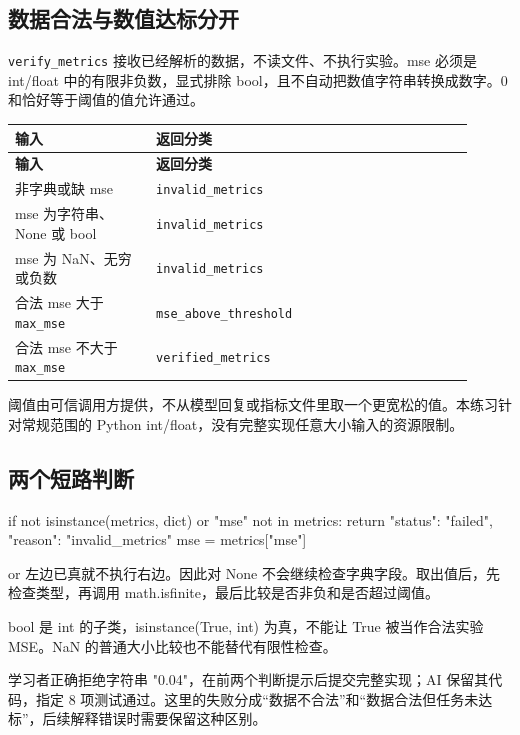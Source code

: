 \documentclass[UTF8,zihao=-4,fontset=fandol]{ctexart}
\begin{document}
\subsection{数据合法与数值达标分开}

\nolinkurl{verify_metrics} 接收已经解析的数据，不读文件、不执行实验。mse 必须是 int/float 中的有限非负数，显式排除 bool，且不自动把数值字符串转换成数字。0 和恰好等于阈值的值允许通过。

{\small\setlength{\tabcolsep}{4pt}
\renewcommand{\arraystretch}{1.25}
\begin{longtable}{>{\raggedright\arraybackslash}p{0.28\linewidth}>{\raggedright\arraybackslash}p{0.63\linewidth}}
\toprule
\textbf{输入} & \textbf{返回分类} \\
\midrule\endfirsthead
\toprule
\textbf{输入} & \textbf{返回分类} \\
\midrule\endhead
\bottomrule\endfoot
非字典或缺 mse & \nolinkurl{invalid_metrics} \\
mse 为字符串、None 或 bool & \nolinkurl{invalid_metrics} \\
mse 为 NaN、无穷或负数 & \nolinkurl{invalid_metrics} \\
合法 mse 大于 \nolinkurl{max_mse} & \nolinkurl{mse_above_threshold} \\
合法 mse 不大于 \nolinkurl{max_mse} & \nolinkurl{verified_metrics} \\
\end{longtable}}

阈值由可信调用方提供，不从模型回复或指标文件里取一个更宽松的值。本练习针对常规范围的 Python int/float，没有完整实现任意大小输入的资源限制。

\subsection{两个短路判断}

\begin{Code}
if not isinstance(metrics, dict) or "mse" not in metrics:
    return {"status": "failed", "reason": "invalid_metrics"}
mse = metrics["mse"]
\end{Code}

or 左边已真就不执行右边。因此对 None 不会继续检查字典字段。取出值后，先检查类型，再调用 math.isfinite，最后比较是否非负和是否超过阈值。

bool 是 int 的子类，isinstance(True, int) 为真，不能让 True 被当作合法实验 MSE。NaN 的普通大小比较也不能替代有限性检查。

学习者正确拒绝字符串 "0.04"，在前两个判断提示后提交完整实现；AI 保留其代码，指定 8 项测试通过。这里的失败分成“数据不合法”和“数据合法但任务未达标”，后续解释错误时需要保留这种区别。
\end{document}
